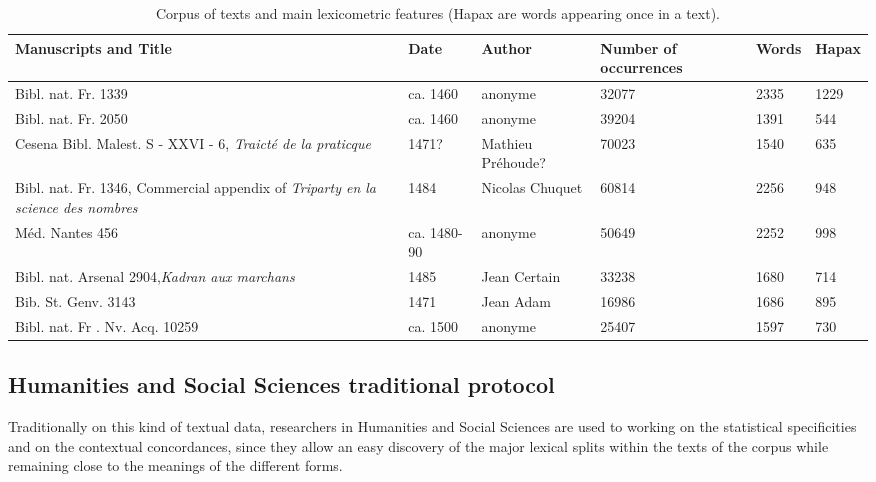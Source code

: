 \documentclass{elsarticle}
\begin{document}
\begin{table}
\begin{center}
\begin{tiny}
\setlength{\arrayrulewidth}{0.5pt}
\begin{tabular}{|p{4cm}|p{1.3cm}|p{1.5cm}|p{1.4cm}|p{1.3cm}|p{1.3cm}|}
\hline
\textbf{Manuscripts} and \textbf{Title} &   \textbf{Date} & \textbf{Author}  & \textbf{Number of occurrences} & \textbf{Words} & \textbf{Hapax} \\\hline\hline
Bibl. nat. Fr. 1339	 &	 ca. 1460		& anonyme & 32077 &2335 & 1229 \\
Bibl. nat. Fr. 2050	 &	 ca. 1460		& anonyme & 39204 &1391 &544 \\
Cesena Bibl. Malest. S - XXVI - 6, \textit{Traict\'e de la praticque}  &	1471?	& Mathieu Pr\'ehoude? & 70023 &1540 &635 \\
Bibl. nat. Fr. 1346, Commercial appendix  of \textit{Triparty en la science des nombres} & 	1484		& Nicolas Chuquet &  60814 & 2256 & 948 \\ 
M\'ed. Nantes 456   & ca. 1480-90		& anonyme & 50649 &2252 & 998\\
Bibl. nat. Arsenal 2904,\textit{Kadran aux marchans} 		&	1485	& Jean Certain & 33238 &1680 &714 \\ 
Bib. St. Genv. 3143 			&	1471 & Jean Adam 	& 16986 & 1686 & 895\\
Bibl. nat. Fr . Nv. Acq. 10259	&		ca. 1500 & anonyme	&25407 & 1597  &730 \\
\hline
\end{tabular}
\end{tiny}
\end{center}
\caption{Corpus of texts and main lexicometric features (Hapax are words appearing once in a text).}
\label{tab:chronomss}
\end{table}

\subsection{Humanities and Social Sciences traditional protocol}

Traditionally on this kind of textual data, researchers in Humanities and Social Sciences are used to working on the statistical specificities and on the contextual concordances, since they allow an easy discovery of the major lexical splits within the texts of the corpus while remaining close to the meanings of the different forms.\\
\end{document}
